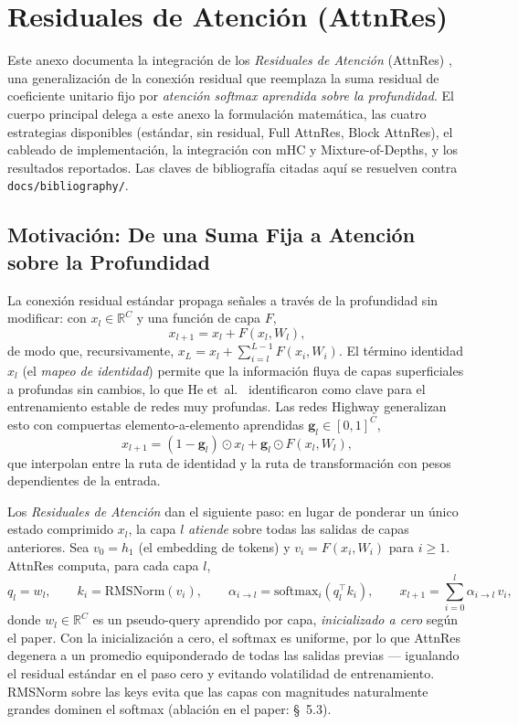 \section{Residuales de Atención (AttnRes)}
\label{sec:annex-attnres}

Este anexo documenta la integración de los \emph{Residuales de Atención}
(AttnRes) \citep{sun_attnres_2026}, una generalización de la conexión
residual que reemplaza la suma residual de coeficiente unitario fijo
por \emph{atención softmax aprendida sobre la profundidad}. El cuerpo
principal delega a este anexo la formulación matemática, las cuatro
estrategias disponibles (estándar, sin residual, Full AttnRes, Block
AttnRes), el cableado de implementación, la integración con mHC y
Mixture-of-Depths, y los resultados reportados. Las claves de
bibliografía citadas aquí se resuelven contra
\texttt{docs/bibliography/}.

\subsection{Motivación: De una Suma Fija a Atención sobre la Profundidad}

La conexión residual estándar \citep{he_deep_2016} propaga señales a
través de la profundidad sin modificar: con $x_l \in \mathbb{R}^{C}$ y
una función de capa $F$,
\[
x_{l+1} = x_l + F(x_l, W_l),
\]
de modo que, recursivamente,
$x_L = x_l + \sum_{i=l}^{L-1} F(x_i, W_i)$. El término identidad $x_l$
(el \emph{mapeo de identidad}) permite que la información fluya de
capas superficiales a profundas sin cambios, lo que He
et~al.~\citep{he_deep_2016} identificaron como clave para el
entrenamiento estable de redes muy profundas. Las redes Highway
\citep{srivastava_highway_2015} generalizan esto con compuertas
elemento-a-elemento aprendidas $\mathbf{g}_l \in [0, 1]^{C}$,
\[
x_{l+1} = (1 - \mathbf{g}_l) \odot x_l + \mathbf{g}_l \odot F(x_l, W_l),
\]
que interpolan entre la ruta de identidad y la ruta de transformación
con pesos dependientes de la entrada.

Los \emph{Residuales de Atención} \citep{sun_attnres_2026} dan el
siguiente paso: en lugar de ponderar un único estado comprimido $x_l$,
la capa $l$ \emph{atiende} sobre todas las salidas de capas anteriores.
Sea $v_0 = h_1$ (el embedding de tokens) y $v_i = F(x_i, W_i)$ para
$i \ge 1$. AttnRes computa, para cada capa $l$,
\[
q_l = w_l, \qquad
k_i = \mathrm{RMSNorm}(v_i), \qquad
\alpha_{i \to l} = \mathrm{softmax}_i(q_l^{\top} k_i), \qquad
x_{l+1} = \sum_{i=0}^{l} \alpha_{i \to l} \, v_i,
\]
donde $w_l \in \mathbb{R}^{C}$ es un pseudo-query aprendido por capa,
\emph{inicializado a cero} según el paper. Con la inicialización a cero,
el softmax es uniforme, por lo que AttnRes degenera a un promedio
equiponderado de todas las salidas previas --- igualando el residual
estándar en el paso cero y evitando volatilidad de entrenamiento.
RMSNorm sobre las keys evita que las capas con magnitudes
naturalmente grandes dominen el softmax (ablación en el paper:
\S~5.3).

